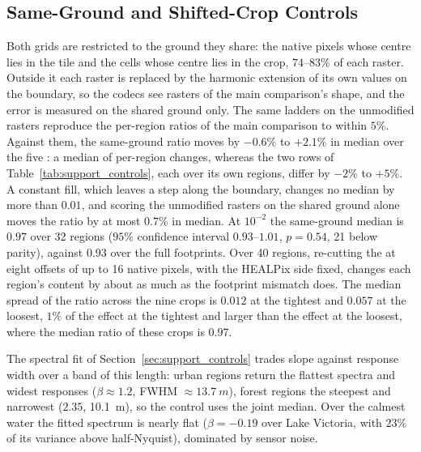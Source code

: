 \subsection{Same-Ground and Shifted-Crop Controls}
\label{app:support}
Both grids are restricted to the ground they share: the native pixels
whose centre lies in the tile and the cells whose centre lies in the
crop, $74$--$83\%$ of each raster. Outside it each raster is replaced by
the harmonic extension of its own values on the boundary, so the codecs
see rasters of the main comparison's shape, and the error is measured on
the shared ground only. The same ladders on the unmodified rasters
reproduce the per-region ratios of the main comparison to within
$5\%$. Against them, the same-ground ratio moves by $-0.6\%$ to $+2.1\%$
in median over the five : a median of per-region changes,
whereas the two rows of Table~\ref{tab:support_controls}, each over its
own regions, differ by $-2\%$ to $+5\%$. A constant fill, which leaves a step
along the boundary, changes no median by more than $0.01$, and scoring
the unmodified rasters on the shared ground alone moves the ratio by at
most $0.7\%$ in median. At $10^{-2}$ the same-ground median is $0.97$
over 32 regions ($95\%$ confidence interval $0.93$--$1.01$, $p=0.54$,
21 below parity), against $0.93$ over the full footprints. Over 40 regions, re-cutting the 
at eight offsets of up to 16 native pixels, with the HEALPix side fixed,
changes each region's content by about as much as the footprint mismatch
does. The median spread of the ratio across the nine crops is $0.012$ at
the tightest  and $0.057$ at the loosest, $1\%$ of the
effect at the tightest  and larger than the effect at the
loosest, where the median ratio of these crops is $0.97$.

The spectral fit of Section~\ref{sec:support_controls} trades slope
against response width over a band of this length: urban regions return
the flattest spectra and widest responses ($\beta\approx1.2$, FWHM
$\approx\SI{13.7}{m}$), forest regions the steepest and narrowest
($2.35$, \SI{10.1}{m}), so the control uses the joint median. Over the
calmest water the fitted spectrum is nearly flat ($\beta=-0.19$ over Lake
Victoria, with $23\%$ of its variance above half-Nyquist), dominated by
sensor noise.

